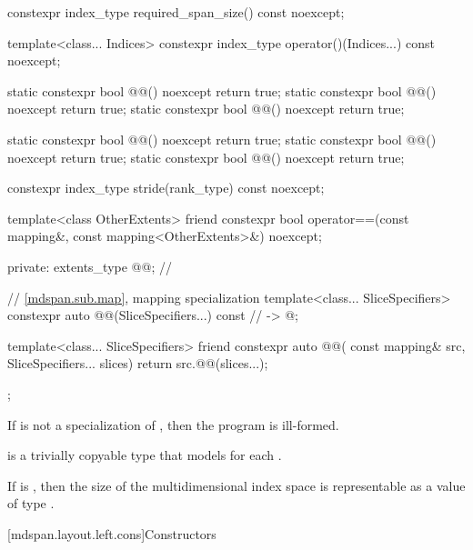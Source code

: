 \begin{codeblock}
{{    constexpr index_type required_span_size() const noexcept;

    template<class... Indices>
      constexpr index_type operator()(Indices...) const noexcept;

    static constexpr bool @@() noexcept { return true; }
    static constexpr bool @@() noexcept { return true; }
    static constexpr bool @@() noexcept { return true; }

    static constexpr bool @@() noexcept { return true; }
    static constexpr bool @@() noexcept { return true; }
    static constexpr bool @@() noexcept { return true; }

    constexpr index_type stride(rank_type) const noexcept;

    template<class OtherExtents>
      friend constexpr bool operator==(const mapping&, const mapping<OtherExtents>&) noexcept;

  private:
    extents_type @@{};                                               // \expos

    // \ref{mdspan.sub.map},  mapping specialization
    template<class... SliceSpecifiers>
      constexpr auto @@(SliceSpecifiers...) const     // \expos
        -> @\seebelow@;

    template<class... SliceSpecifiers>
      friend constexpr auto @@(
        const mapping& src, SliceSpecifiers... slices) {
          return src.@@(slices...);
      }
  };
}
\end{codeblock}

\pnum
If  is not a specialization of ,
then the program is ill-formed.

\pnum
{} is a trivially copyable type
that models  for each .

\pnum
\mandates
If  is ,
then the size of the multidimensional index space 
is representable as a value of type .

[mdspan.layout.left.cons]{Constructors}

